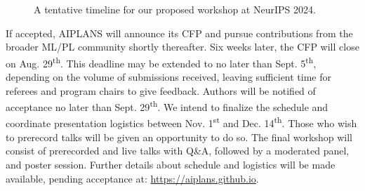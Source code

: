 \documentclass{article}
\begin{document}
\begin{figure}[H]
        \caption{A tentative timeline for our proposed workshop at NeurIPS 2024.}
    \end{figure}

    If accepted, AIPLANS will announce its CFP and pursue contributions from the broader ML/PL community shortly thereafter. Six weeks later, the CFP will close on Aug. 29\textsuperscript{th}. This deadline may be extended to no later than Sept. 5\textsuperscript{th}, depending on the volume of submissions received, leaving sufficient time for referees and program chairs to give feedback. Authors will be notified of acceptance no later than Sept. 29\textsuperscript{th}. We intend to finalize the schedule and coordinate presentation logistics between Nov. 1\textsuperscript{st} and Dec. 14\textsuperscript{th}. Those who wish to prerecord talks will be given an opportunity to do so. The final workshop will consist of prerecorded and live talks with Q\&A, followed by a moderated panel, and poster session. Further details about schedule and logistics will be made available, pending acceptance at: \url{https://aiplans.github.io}.
\end{document}
